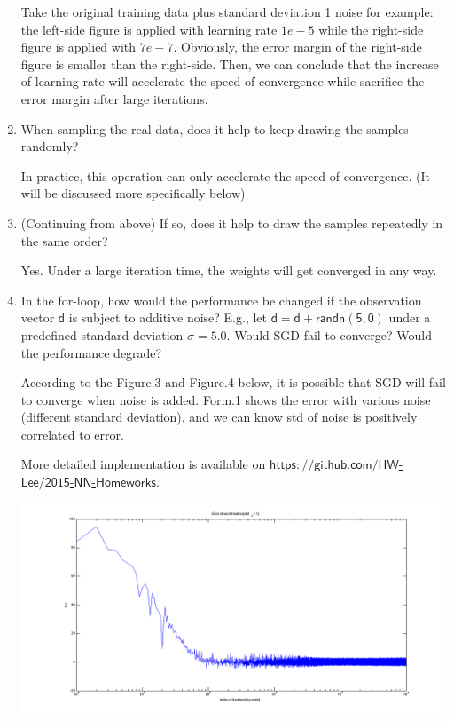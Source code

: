 \documentclass[12pt]{article}
\begin{document}
\begin{enumerate}
	\begin{flushleft}
		Take the original training data plus standard deviation 1 noise for example: the left-side figure is applied with learning rate $1e-5$ while the right-side figure is applied with $7e-7$. Obviously, the error margin of the right-side figure is smaller than the right-side. Then, we can conclude that the increase of learning rate will accelerate the speed of convergence while sacrifice the error margin after large iterations.
	\end{flushleft}
	\item When sampling the real data, does it help to keep drawing the samples randomly?
	\begin{flushleft}
		In practice, this operation can only accelerate the speed of convergence. (It will be discussed more specifically below)
	\end{flushleft}
	\item (Continuing from above) If so, does it help to draw the samples repeatedly in the same order?
	\begin{flushleft}
		Yes. Under a large iteration time, the weights will get converged in any way.
	\end{flushleft}
	\item In the for-loop, how would the performance be changed if the observation vector $\mathsf{d}$ is subject to additive noise? 
		E.g., let $\mathsf{d = d + randn(5, 0)}$ under a predefined standard deviation $\sigma = 5.0$. Would SGD fail to converge? 
		Would the performance degrade? 
		\begin{flushleft}
			According to the Figure.3 and Figure.4 below, it is possible that SGD will fail to converge when noise is added. Form.1 shows the error with various noise (different standard deviation), and we can know std of noise is positively correlated to error.
		\end{flushleft}
		\begin{center}
			More detailed implementation is available on \href{https://github.com/HW-Lee/2015-NN-Homeworks}{$\mathsf{https://github.com/HW}$-$\mathsf{Lee/2015}$-$\mathsf{NN}$-$\mathsf{Homeworks}$}.
		\end{center}
	\hspace*{-4em}
	\includegraphics[scale=.45]{../res/error_std1_eta7-7.png}

\end{enumerate}
\end{document}
